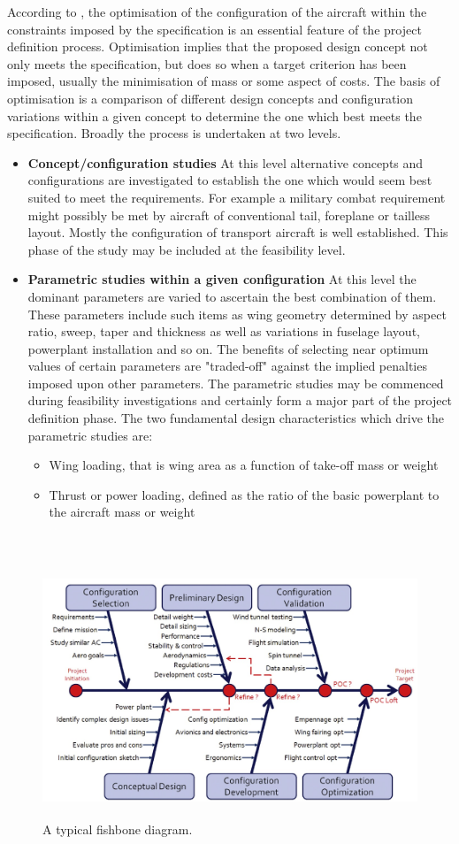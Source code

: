 According to \cite{howe2000aircraft}, the optimisation of the configuration of the aircraft within the constraints imposed by the specification is an essential feature of the project definition process. Optimisation implies that the proposed design concept not only meets the specification, but does so when a target criterion has been imposed, usually the minimisation of mass or some aspect of costs.
%
The basis of optimisation is a comparison of different design concepts and configuration variations within a given concept to determine the one which best meets the specification. Broadly the process is undertaken at two levels.
%
\begin{itemize}
\item \textbf{Concept/configuration studies} At this level alternative concepts and configurations are investigated to establish the one which would seem best suited to meet the requirements. For example a military combat requirement might possibly be met by aircraft of conventional tail, foreplane or tailless layout. Mostly the configuration of transport aircraft is well established. This phase of the study may be included at the feasibility level.
\item \textbf{Parametric studies within a given configuration} At this level the dominant parameters are varied to ascertain the best combination of them. These parameters include such items as wing geometry determined by aspect ratio, sweep, taper and thickness as well as variations in fuselage layout, powerplant installation and so on. The benefits of selecting near optimum values of certain parameters are "traded-off" against the implied penalties
imposed upon other parameters. The parametric studies may be commenced during feasibility investigations and certainly form a major part of the project definition phase. The two fundamental design characteristics which drive the parametric studies are:
\begin{itemize}
\item Wing loading, that is wing area as a function of take-off mass or weight
\item Thrust or power loading, defined as the ratio of the basic powerplant to the aircraft mass or weight
\end{itemize}
\end{itemize}
\noindent \\

\begin{figure}[H]
\centering
\includegraphics[height=7.6cm]{Immagini/Fishbone}
\caption{A typical fishbone diagram.}
\label{comp}
\end{figure}
